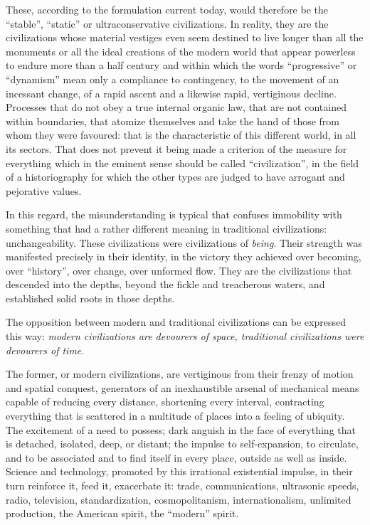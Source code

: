 These, according to the formulation current today, would therefore be the ``stable'', ``static'' or ultraconservative civilizations. In reality, they are the civilizations whose material vestiges even seem destined to live longer than all the monuments or all the ideal creations of the modern world that appear powerless to endure more than a half century and within which the words ``progressive'' or ``dynamism'' mean only a compliance to contingency, to the movement of an incessant change, of a rapid ascent and a likewise rapid, vertiginous decline. Processes that do not obey a true internal organic law, that are not contained within boundaries, that atomize themselves and take the hand of those from whom they were favoured: that is the characteristic of this different world, in all its sectors. That does not prevent it being made a criterion of the measure for everything which in the eminent sense should be called ``civilization'', in the field of a historiography for which the other types are judged to have arrogant and pejorative values.

In this regard, the misunderstanding is typical that confuses immobility with something that had a rather different meaning in traditional civilizations: unchangeability. These civilizations were civilizations of \emph{being}. Their strength was manifested precisely in their identity, in the victory they achieved over becoming, over ``history'', over change, over unformed flow. They are the civilizations that descended into the depths, beyond the fickle and treacherous waters, and established solid roots in those depths.

The opposition between modern and traditional civilizations can be expressed this way: \emph{modern civilizations are devourers of space, traditional civilizations were devourers of time}.

The former, or modern civilizations, are vertiginous from their frenzy of motion and spatial conquest, generators of an inexhaustible arsenal of mechanical means capable of reducing every distance, shortening every interval, contracting everything that is scattered in a multitude of places into a feeling of ubiquity. The excitement of a need to possess; dark anguish in the face of everything that is detached, isolated, deep, or distant; the impulse to self-expansion, to circulate, and to be associated and to find itself in every place, outside as well as inside. Science and technology, promoted by this irrational existential impulse, in their turn reinforce it, feed it, exacerbate it: trade, communications, ultrasonic speeds, radio, television, standardization, cosmopolitanism, internationalism, unlimited production, the American spirit, the ``modern'' spirit.


